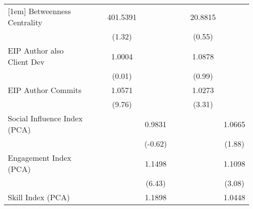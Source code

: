 {\begin{tabular}{l*{8}{c}}
[1em]
Betweenness Centrality             &                     &                     &    401.5391         &                     &                     &                     &     20.8815         &                     \\
                                   &                     &                     &      (1.32)         &                     &                     &                     &      (0.55)         &                     \\
[1em]
EIP Author also Client Dev         &                     &                     &      1.0004         &                     &                     &                     &      1.0878         &                     \\
                                   &                     &                     &      (0.01)         &                     &                     &                     &      (0.99)         &                     \\
[1em]
EIP Author Commits                 &                     &                     &      1.0571\sym{***}&                     &                     &                     &      1.0273\sym{***}&                     \\
                                   &                     &                     &      (9.76)         &                     &                     &                     &      (3.31)         &                     \\
[1em]
Social Influence Index (PCA)       &                     &                     &                     &      0.9831         &                     &                     &                     &      1.0665\sym{*}  \\
                                   &                     &                     &                     &     (-0.62)         &                     &                     &                     &      (1.88)         \\
[1em]
Engagement Index (PCA)             &                     &                     &                     &      1.1498\sym{***}&                     &                     &                     &      1.1098\sym{***}\\
                                   &                     &                     &                     &      (6.43)         &                     &                     &                     &      (3.08)         \\
[1em]
Skill Index (PCA)                  &                     &                     &                     &      1.1898\sym{***}&                     &                     &                     &      1.0448         \\

\end{tabular}}
